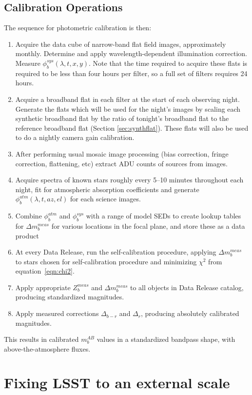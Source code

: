\documentclass[12pt,preprint]{aastex}
\begin{document}
\subsection{Calibration Operations}
The sequence for photometric calibration is then:
\begin{enumerate}
\item{Acquire the data cube of narrow-band flat field images,
approximately monthly. Determine and apply wavelength-dependent illumination
correction. Measure $\phi_b^{sys}(\lambda,t,x,y)$. Note that the time
required to acquire these flats is required to be less than four hours
per filter, so a full set of filters requires 24 hours.}
\item{Acquire a broadband flat in each filter at the start 
of each observing night. Generate the flats which will be used for
the night's images by scaling each synthetic broadband flat by the
ratio of tonight's broadband flat to the reference broadband
flat (Section \ref{sec:synthflat})}.  These flats will also be used to do 
a nightly camera gain calibration.
\item{After performing usual mosaic image processing (bias correction, fringe
correction, flattening, etc) extract ADU counts of sources from images. }
\item{Acquire spectra of known stars roughly every 5--10 minutes
throughout each night, fit for atmospheric absorption coefficients and
generate $\phi_b^{atm}(\lambda,t, az, el)$ for each science images. }
\item{Combine $\phi_b^{atm}$ and $\phi_b^{sys}$ with a range of model
SEDs to create lookup tables for $\Delta m_b^{meas}$ for various
locations in the focal plane, and store these as a data product }
\item{At every Data Release, run the
self-calibration procedure, applying $\Delta m_b^{meas}$ to stars
chosen for self-calibration procedure and minimizing $\chi^2$ from
equation~\ref{eqn:chi2}.}
\item{Apply appropriate $Z_b^{meas}$ and $\Delta
m_b^{meas}$  to all objects in Data Release catalog, producing
standardized magnitudes.}
\item{Apply measured corrections $\Delta_{b-r}$ and $\Delta_r$,
producing absolutely calibrated magnitudes.}
\end{enumerate}
This results in calibrated $m_b^{AB}$ values in a standardized
bandpass shape, with above-the-atmosphere fluxes.

\section{Fixing LSST to an external scale}
\label{sec:calib_external}
\end{document}
